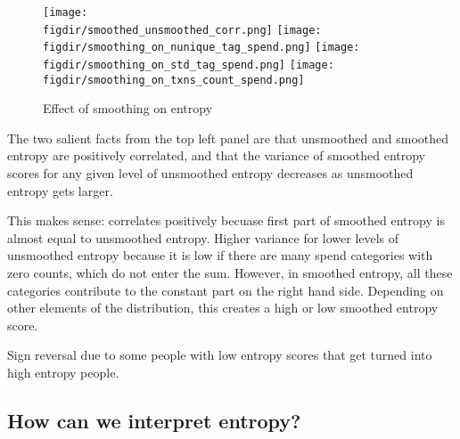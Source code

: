 

\begin{figure}[h]
    \centering 
    \caption{Effect of smoothing on entropy}
    \label{fig:effect_of_smoothing}
    \texttt{[image: \\figdir/smoothed\_unsmoothed\_corr.png]}
    \texttt{[image: \\figdir/smoothing\_on\_nunique\_tag\_spend.png]}
    \texttt{[image: \\figdir/smoothing\_on\_std\_tag\_spend.png]}
    \texttt{[image: \\figdir/smoothing\_on\_txns\_count\_spend.png]}
\end{figure}


\newpage



The two salient facts from the top left panel are that unsmoothed and smoothed
entropy are positively correlated, and that the variance of smoothed entropy
scores for any given level of unsmoothed entropy decreases as unsmoothed
entropy gets larger.

This makes sense: correlates positively becuase first part of smoothed entropy
is almost equal to unsmoothed entropy. Higher variance for lower levels of
unsmoothed entropy because it is low if there are many spend categories with zero
counts, which do not enter the sum. However, in smoothed entropy, all these
categories contribute to the constant part on the right hand side. Depending on
other elements of the distribution, this creates a high or low smoothed entropy
score.

Sign reversal due to some people with low entropy scores that get turned into
high entropy people.



\subsection{How can we interpret entropy?}%
\label{sub:is_entropy_more_than_the_sum_of_its_parts_}

